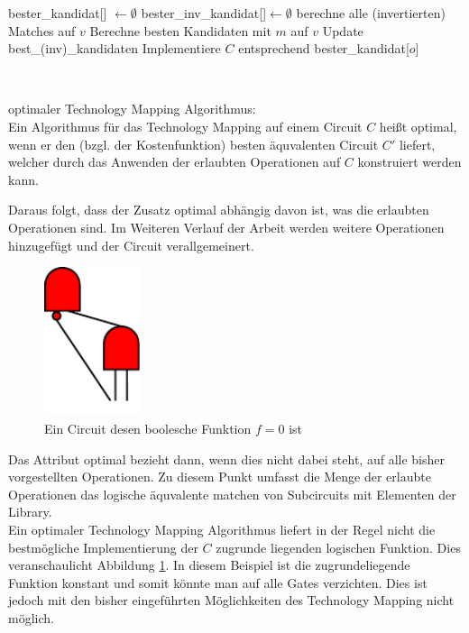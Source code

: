 \documentclass[11pt, a4paper, german]{article}
\newcommand{\TM}{Technology Mapping }
\begin{document}
\begin{algorithm}[H]
 \LinesNumbered
 \DontPrintSemicolon
 \caption{(einfaches) Technology Mapping}

 bester\_kandidat[] $\gets \emptyset$\;
 bester\_inv\_kandidat[]$ \gets \emptyset$\;
 {
   berechne alle (invertierten) Matches auf $v$\;
   {
      Berechne besten Kandidaten mit $m$ auf $v$\;
      Update best\_(inv)\_kandidaten\;
   }
 }
 Implementiere $C$ entsprechend bester\_kandidat[$o$]\;
\end{algorithm}\ \\

\begin{definition}{optimaler \TM Algorithmus:}\\
	Ein Algorithmus für das \TM auf einem Circuit $C$ heißt optimal, wenn er den (bzgl. der Kostenfunktion) besten äquvalenten Circuit $C'$ liefert, welcher durch das Anwenden der erlaubten Operationen auf $C$ konstruiert werden kann. 
\end{definition}
Daraus folgt, dass der Zusatz optimal abhängig davon ist, was die erlaubten Operationen sind.
Im Weiteren Verlauf der Arbeit werden weitere Operationen hinzugefügt und der Circuit verallgemeinert. 
\begin{figure}
		\includegraphics[width = 2.8cm]{pictures/compiled/compl_redundant}
		\caption{Ein Circuit desen boolesche Funktion $f = 0 $ ist}
		\label{bild:compl_redundant}
\end{figure}
Das Attribut optimal bezieht dann, wenn dies nicht dabei steht,  auf alle bisher vorgestellten Operationen. Zu diesem Punkt umfasst die Menge der erlaubte Operationen das logische äquvalente matchen von Subcircuits mit Elementen der Library.\\

Ein optimaler \TM Algorithmus liefert in der Regel nicht die bestmögliche Implementierung der $C$ zugrunde liegenden logischen Funktion. Dies veranschaulicht Abbildung \ref{bild:compl_redundant}. In diesem Beispiel ist die zugrundeliegende Funktion konstant und somit könnte man auf alle Gates verzichten. Dies ist jedoch mit den bisher eingeführten Möglichkeiten des \TM nicht möglich. \\
\end{document}
